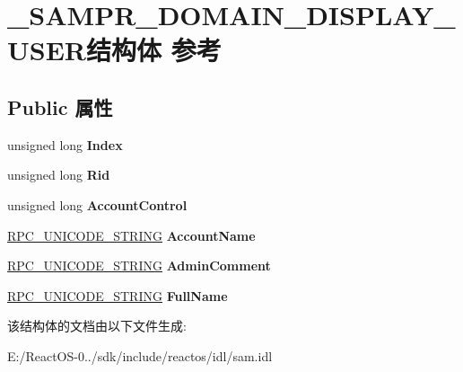 \hypertarget{struct___s_a_m_p_r___d_o_m_a_i_n___d_i_s_p_l_a_y___u_s_e_r}{}\section{\+\_\+\+S\+A\+M\+P\+R\+\_\+\+D\+O\+M\+A\+I\+N\+\_\+\+D\+I\+S\+P\+L\+A\+Y\+\_\+\+U\+S\+E\+R结构体 参考}
\label{struct___s_a_m_p_r___d_o_m_a_i_n___d_i_s_p_l_a_y___u_s_e_r}
\subsection*{Public 属性}
\begin{DoxyCompactItemize}
\item 
\mbox{\label{struct___s_a_m_p_r___d_o_m_a_i_n___d_i_s_p_l_a_y___u_s_e_r_a8b5e6de1c10bed71cda3530b5788c7c3}} 
unsigned long {\bfseries Index}
\item 
\mbox{\label{struct___s_a_m_p_r___d_o_m_a_i_n___d_i_s_p_l_a_y___u_s_e_r_a25ddc124e1eba9ab14080462fe77927c}} 
unsigned long {\bfseries Rid}
\item 
\mbox{\label{struct___s_a_m_p_r___d_o_m_a_i_n___d_i_s_p_l_a_y___u_s_e_r_a0f3723443afb78a219a5a7d40aa02d9b}} 
unsigned long {\bfseries Account\+Control}
\item 
\mbox{\label{struct___s_a_m_p_r___d_o_m_a_i_n___d_i_s_p_l_a_y___u_s_e_r_a1dee1d67db33b73589c5f438dbf881b2}} 
\hyperlink{struct___r_p_c___u_n_i_c_o_d_e___s_t_r_i_n_g}{R\+P\+C\+\_\+\+U\+N\+I\+C\+O\+D\+E\+\_\+\+S\+T\+R\+I\+NG} {\bfseries Account\+Name}
\item 
\mbox{\label{struct___s_a_m_p_r___d_o_m_a_i_n___d_i_s_p_l_a_y___u_s_e_r_a18bdfdca2e0e8600dc124f9c1f12ecb6}} 
\hyperlink{struct___r_p_c___u_n_i_c_o_d_e___s_t_r_i_n_g}{R\+P\+C\+\_\+\+U\+N\+I\+C\+O\+D\+E\+\_\+\+S\+T\+R\+I\+NG} {\bfseries Admin\+Comment}
\item 
\mbox{\label{struct___s_a_m_p_r___d_o_m_a_i_n___d_i_s_p_l_a_y___u_s_e_r_aa5bfe332cae135a23683503403464b20}} 
\hyperlink{struct___r_p_c___u_n_i_c_o_d_e___s_t_r_i_n_g}{R\+P\+C\+\_\+\+U\+N\+I\+C\+O\+D\+E\+\_\+\+S\+T\+R\+I\+NG} {\bfseries Full\+Name}
\end{DoxyCompactItemize}


该结构体的文档由以下文件生成\+:\begin{DoxyCompactItemize}
\item 
E\+:/\+React\+O\+S-\/0../sdk/include/reactos/idl/sam.\+idl\end{DoxyCompactItemize}
